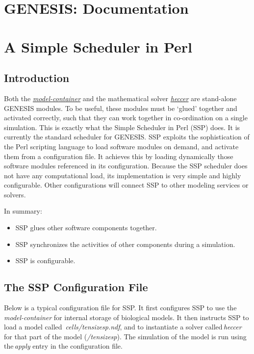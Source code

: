 \documentclass[12pt]{article}
\begin{document}
\section*{GENESIS: Documentation}

\section*{A Simple Scheduler in Perl}

\subsection*{Introduction}

Both the \href{../model-container/model-container.tex}{\it model-container} and the mathematical solver \href{../heccer/heccer.tex}{\it heccer} are stand-alone GENESIS modules. To be useful, these modules must be `glued' together and activated correctly, such that they can work together in co-ordination on a single simulation. This is exactly what the Simple Scheduler in Perl (SSP) does. It is currently the standard scheduler for GENESIS. SSP exploits the sophistication of the Perl scripting language to load software modules on demand, and activate them from a configuration file. It achieves this by loading dynamically those software modules referenced in its configuration. Because the SSP scheduler does not have any computational load, its implementation is very simple and highly configurable. Other configurations will connect SSP to other modeling services or solvers.

In summary:

\begin{itemize}
\item SSP glues other software components together.
\item SSP synchronizes the activities of other components during a simulation.
\item SSP is configurable. 
\end{itemize}

\subsection*{The SSP Configuration File}

Below is a typical configuration file for SSP. It first configures SSP to use the\,{\it model-container} for internal storage of biological models. It then instructs SSP to load a model called \,{\it cells/tensizesp.ndf}, and to instantiate a solver called\,{\it heccer} for that part of the model ({\it /tensizesp}). The simulation of the model is run using the\,{\it apply} entry in the configuration file.
\end{document}
